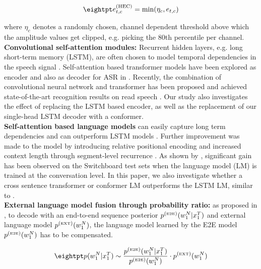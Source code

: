 \documentclass[a4paper]{article}
\begin{document}
\vspace{-5.9mm}
\begin{align}
\eightpt
 e^{(\text{HEC})}_{t,c} = \min(\eta_{c}, e_{t,c})
\end{align}
\vspace{-3.5mm}

\noindent where $\eta_{c}$ denotes a randomly chosen, channel dependent threshold above which the amplitude values get clipped, e.g. picking the 80th percentile per channel.
\\ {\bf Convolutional self-attention modules:}
Recurrent hidden layers, e.g. long short-term memory (LSTM), are often chosen to model temporal dependencies in the speech signal \cite{Hochreiter97}.
Self-attention based transformer models have been explored as encoder and also as decoder  for ASR in \cite{Sperber2018,Povey2018,Zhang2020,Dong2018}.
Recently, the combination of convolutional neural network and transformer has been proposed and achieved state-of-the-art recognition results on read speech \cite{Gulati2020}.
Our study also investigates the effect of replacing the LSTM based encoder, as well as the replacement of our single-head LSTM decoder with a conformer.
\\ {\bf Self-attention based language models}
can easily capture long term dependencies and can outperform LSTM models \cite{AlRfou}.
Further improvement was made to the model by introducing relative positional encoding and increased context length through segment-level recurrence \cite{dai2019}.
As shown by \cite{Tuske2018,Xiong2018}, significant gain has been observed on the Switchboard test sets when the language model (LM) is trained at the conversation level.
In this paper, we also investigate whether a cross sentence transformer or conformer LM outperforms the LSTM LM, similar to \cite{irie19:asru}.
\\ {\bf External language model fusion through probability ratio:}
as proposed in \cite{McDermott2019}, to decode with an end-to-end sequence posterior $p^{(\text{\tiny E2E})}(w_1^N|x_1^T)$ and external language model $p^{(\text{\tiny EXT})}(w_1^N)$, the language model learned by the E2E model $p^{(\text{\tiny E2E})}(w_1^N)$  has to be compensated.

\vspace{-4mm}
\begin{align}
\eightpt
 p(w_1^N|x^T_1) \sim \frac{p^{(\text{\tiny E2E})}(w_1^N|x^T_1)}{p^{(\text{\tiny E2E})}(w_1^N)} \cdot p^{(\text{\tiny EXT})}(w_1^N) \label{eq:probratio}
\end{align}
\vspace{-3mm}
\end{document}
